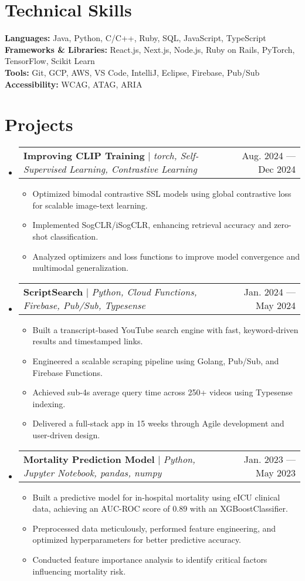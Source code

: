 \documentclass[letterpaper,12pt]{article}
\makeatletter
\newcommand{\resumeItem}[1]{
  \item\small{
    {#1 \vspace{-2pt}}
  }
}
\newcommand{\resumeProjectHeading}[2]{
    \item
    \begin{tabular*}{0.97\textwidth}{l@{\extracolsep{\fill}}r}
      \small#1 & #2 \\
    \end{tabular*}\vspace{-7pt}
}
\newcommand{\resumeSubHeadingListStart}{\begin{itemize}[leftmargin=0pt, label={}]}
\newcommand{\resumeSubHeadingListEnd}{\end{itemize}}
\newcommand{\resumeItemListStart}{\begin{itemize}[leftmargin=10pt]}
\newcommand{\resumeItemListEnd}{\end{itemize}\vspace{-10pt}}
\makeatother
\begin{document}
\section{Technical Skills}
\textbf{Languages:} Java, Python, C/C++, Ruby, SQL, JavaScript, TypeScript \\
\textbf{Frameworks \& Libraries:} React.js, Next.js, Node.js, Ruby on Rails, PyTorch, TensorFlow, Scikit Learn \\
\textbf{Tools:} Git, GCP, AWS, VS Code, IntelliJ, Eclipse, Firebase, Pub/Sub \\
\textbf{Accessibility:} WCAG, ATAG, ARIA \\


\vspace{-5pt}
\section{Projects}
    \resumeSubHeadingListStart
        \resumeProjectHeading
        {\textbf{Improving CLIP Training} $|$ \emph{torch, Self-Supervised Learning, Contrastive Learning}}{Aug. 2024 --- Dec 2024}
        \resumeItemListStart
            \resumeItem{Optimized bimodal contrastive SSL models using global contrastive loss for scalable image-text learning.}
            \resumeItem{Implemented SogCLR/iSogCLR, enhancing retrieval accuracy and zero-shot classification.}
            \resumeItem{Analyzed optimizers and loss functions to improve model convergence and multimodal generalization.}
        \resumeItemListEnd
        
        \resumeProjectHeading
        {\textbf{ScriptSearch} $|$ \emph{Python, Cloud Functions, Firebase, Pub/Sub, Typesense}}{Jan. 2024 --- May 2024}
        \resumeItemListStart
            \resumeItem{Built a transcript-based YouTube search engine with fast, keyword-driven results and timestamped links.}
            \resumeItem{Engineered a scalable scraping pipeline using Golang, Pub/Sub, and Firebase Functions.}
            \resumeItem{Achieved sub-4s average query time across 250+ videos using Typesense indexing.}
            \resumeItem{Delivered a full-stack app in 15 weeks through Agile development and user-driven design.}
        \resumeItemListEnd

        \resumeProjectHeading
        {\textbf{Mortality Prediction Model} $|$ \emph{Python, Jupyter Notebook, pandas, numpy}}{Jan. 2023 --- May 2023}
        \resumeItemListStart
            \resumeItem{Built a predictive model for in-hospital mortality using eICU clinical data, achieving an AUC-ROC score of $0.89$ with an XGBoostClassifier.}
            \resumeItem{Preprocessed data meticulously, performed feature engineering, and optimized hyperparameters for better predictive accuracy.}
            \resumeItem{Conducted feature importance analysis to identify critical factors influencing mortality risk.}
        \resumeItemListEnd
    \resumeSubHeadingListEnd

\end{document}
